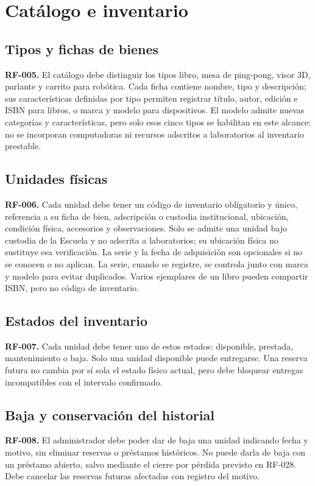 \section{Cat\'alogo e inventario}

\subsection{Tipos y fichas de bienes}
\textbf{RF-005.} El cat\'alogo debe distinguir los tipos libro, mesa de ping-pong, visor 3D, parlante y carrito para rob\'otica. Cada ficha contiene nombre, tipo y descripci\'on; sus caracter\'isticas definidas por tipo permiten registrar t\'itulo, autor, edici\'on e ISBN para libros, o marca y modelo para dispositivos. El modelo admite nuevas categor\'ias y caracter\'isticas, pero solo esos cinco tipos se habilitan en este alcance: no se incorporan computadoras ni recursos adscritos a laboratorios al inventario prestable.

\subsection{Unidades f\'isicas}
\textbf{RF-006.} Cada unidad debe tener un c\'odigo de inventario obligatorio y \'unico, referencia a su ficha de bien, adscripci\'on o custodia institucional, ubicaci\'on, condici\'on f\'isica, accesorios y observaciones. Solo se admite una unidad bajo custodia de la Escuela y no adscrita a laboratorios; su ubicaci\'on f\'isica no sustituye esa verificaci\'on. La serie y la fecha de adquisici\'on son opcionales si no se conocen o no aplican. La serie, cuando se registre, se controla junto con marca y modelo para evitar duplicados. Varios ejemplares de un libro pueden compartir ISBN, pero no c\'odigo de inventario.

\subsection{Estados del inventario}
\textbf{RF-007.} Cada unidad debe tener uno de estos estados: disponible, prestada, mantenimiento o baja. Solo una unidad disponible puede entregarse. Una reserva futura no cambia por s\'i sola el estado f\'isico actual, pero debe bloquear entregas incompatibles con el intervalo confirmado.

\subsection{Baja y conservaci\'on del historial}
\textbf{RF-008.} El administrador debe poder dar de baja una unidad indicando fecha y motivo, sin eliminar reservas o pr\'estamos hist\'oricos. No puede darla de baja con un pr\'estamo abierto, salvo mediante el cierre por p\'erdida previsto en RF-028. Debe cancelar las reservas futuras afectadas con registro del motivo.

